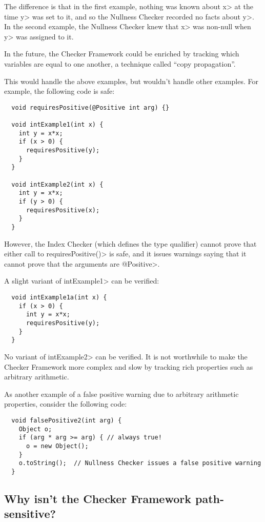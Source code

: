 The difference is that in the first example, nothing was known about \<x> at
the time \<y> was set to it, and so the Nullness Checker recorded no facts
about \<y>.  In the second example, the Nullness Checker knew that \<x>
was non-null when \<y> was assigned to it.

In the future, the Checker Framework could be enriched by tracking which
variables are equal to one another, a technique called ``copy
propagation''.

This would handle the above examples, but wouldn't handle other examples.
For example, the following code is safe:

\begin{Verbatim}
  void requiresPositive(@Positive int arg) {}

  void intExample1(int x) {
    int y = x*x;
    if (x > 0) {
      requiresPositive(y);
    }
  }

  void intExample2(int x) {
    int y = x*x;
    if (y > 0) {
      requiresPositive(x);
    }
  }
\end{Verbatim}

\noindent
However, the Index Checker (which defines the
 type qualifier) cannot prove
that either call to \<requiresPositive()> is safe, and it issues warnings
saying that it cannot prove that the arguments are \<@Positive>.

A slight variant of \<intExample1> can be verified:

\begin{Verbatim}
  void intExample1a(int x) {
    if (x > 0) {
      int y = x*x;
      requiresPositive(y);
    }
  }
\end{Verbatim}

\noindent
No variant of \<intExample2> can be verified.  It is not worthwhile to make
the Checker Framework more complex and slow by tracking rich properties
such as arbitrary arithmetic.

As another example of a false positive warning due to arbitrary arithmetic
properties, consider the following code:

\begin{Verbatim}
  void falsePositive2(int arg) {
    Object o;
    if (arg * arg >= arg) { // always true!
      o = new Object();
    }
    o.toString();  // Nullness Checker issues a false positive warning
  }
\end{Verbatim}


\subsection{Why isn't the Checker Framework path-sensitive?\label{faq-path-sensitive}}

